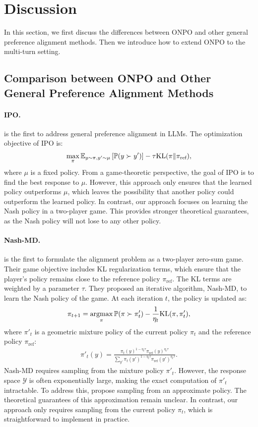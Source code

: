 \section{Discussion}\label{sec:discuss}
In this section, we first discuss the differences between ONPO and other general preference alignment methods. Then we introduce how to extend ONPO to the multi-turn setting.
\subsection{Comparison between ONPO and Other General Preference Alignment Methods}
\paragraph{IPO.}\citet{azar2024general} is the first to address general preference alignment in LLMs. The optimization objective of IPO is:
\begin{align*}
\max_{\pi} \mathbb{E}_{y \sim \pi, y' \sim \mu}\left[\mathbb{P}(y \succ y')\right]-\tau \mathrm{KL}(\pi \Vert \pi_{\textrm{ref}}),
\end{align*}
where $\mu$ is a fixed policy. From a game-theoretic perspective, the goal of IPO is to find the best response to $\mu$. However, this approach only ensures that the learned policy outperforms $\mu$, which leaves the possibility that another policy could outperform the learned policy. In contrast, our approach focuses on learning the Nash policy in a two-player game. This provides stronger theoretical guarantees, as the Nash policy will not lose to any other policy.

\paragraph{Nash-MD.}\citet{munos2023nash} is the first to formulate the alignment problem as a two-player zero-sum game. Their game objective includes KL regularization terms, which ensure that the player's policy remains close to the reference policy $\pi_{\textrm{ref}}$. The KL terms are weighted by a parameter $\tau$. They proposed an iterative algorithm, Nash-MD, to learn the Nash policy of the game. At each iteration $t$, the policy is updated as:
\begin{align*}
\pi_{t+1}=\mathop{\mathrm{argmax}}_{\pi} \mathbb{P}(\pi \succ \pi'_t)-\frac{1}{\eta_t} \mathrm{KL}(\pi,\pi'_t),
\end{align*}
where $\pi'_t$ is a geometric mixture policy of the current policy $\pi_t$ and the reference policy $\pi_{\textrm{ref}}$:
\begin{align*}
\pi'_t(y)=\frac{\pi_t(y)^{1-\eta_t \tau}\pi_{\textrm{ref}}(y)^{\eta_t \tau}}{\sum_{y'}{\pi_t(y')^{1-\eta_t \tau}\pi_{\textrm{ref}}(y')^{\eta_t \tau}}}.
\end{align*}
Nash-MD requires sampling from the mixture policy $\pi'_t$. However, the response space $\mathcal{Y}$ is often exponentially large, making the exact computation of $\pi'_t$ intractable. To address this, \citet{munos2023nash} propose sampling from an approximate policy. The theoretical guarantees of this approximation remain unclear. In contrast, our approach only requires sampling from the current policy $\pi_t$, which is straightforward to implement in practice.

